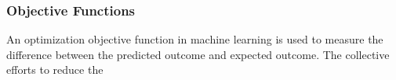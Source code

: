 \subsubsection{Objective Functions}
An optimization objective function in machine learning is used to measure the difference between the predicted outcome and expected outcome. The collective efforts to reduce the 